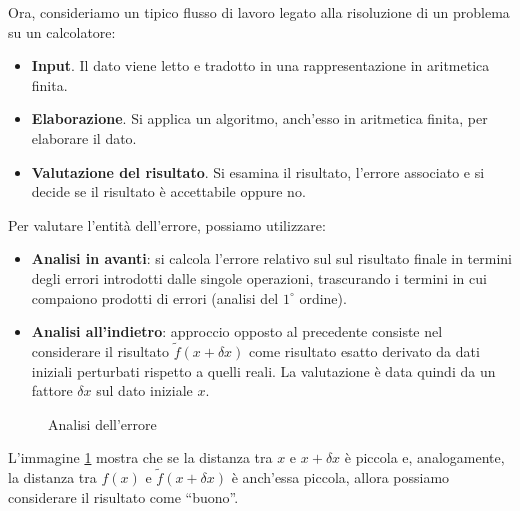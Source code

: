 \documentclass{article}
\numberwithin{equation}{section}
\begin{document}
Ora, consideriamo un tipico flusso di lavoro legato alla risoluzione di un
problema su un calcolatore:
\begin{itemize}
    \item \textbf{Input}. Il dato viene letto e tradotto in
        una rappresentazione in aritmetica finita.
    \item \textbf{Elaborazione}. Si applica un algoritmo, anch'esso in aritmetica
    finita, per elaborare il dato.
    \item \textbf{Valutazione del risultato}. Si esamina il risultato,
        l'errore associato e si decide se il risultato è
        accettabile oppure no.
\end{itemize}
Per valutare l'entità dell'errore, possiamo utilizzare:
\begin{itemize}
    \item\textbf{Analisi in avanti}: si calcola l'errore relativo sul
        sul risultato finale in termini degli errori introdotti dalle singole
        operazioni, trascurando i termini in cui compaiono prodotti di errori
        (analisi del $1^{\circ}$ ordine).
    \item\textbf{Analisi all'indietro}: approccio opposto al precedente
        consiste nel considerare il risultato $\tilde{f}(x+\delta x)$ come risultato 
        esatto derivato da dati iniziali perturbati rispetto a quelli reali.
        La valutazione è data quindi da un fattore
        $\delta x$ sul dato iniziale $x$.
\end{itemize}
\begin{figure}
    \centering
\caption{Analisi dell'errore}
\label{fig:analisi_errore}
\end{figure}
L'immagine \ref{fig:analisi_errore} mostra che se la distanza tra $x$ e
$x+\delta x$ è piccola e, analogamente, la distanza tra $f(x)$ e
$\tilde{f}(x+\delta x)$ è anch'essa piccola, allora possiamo considerare il
risultato come ``buono''.
\end{document}
